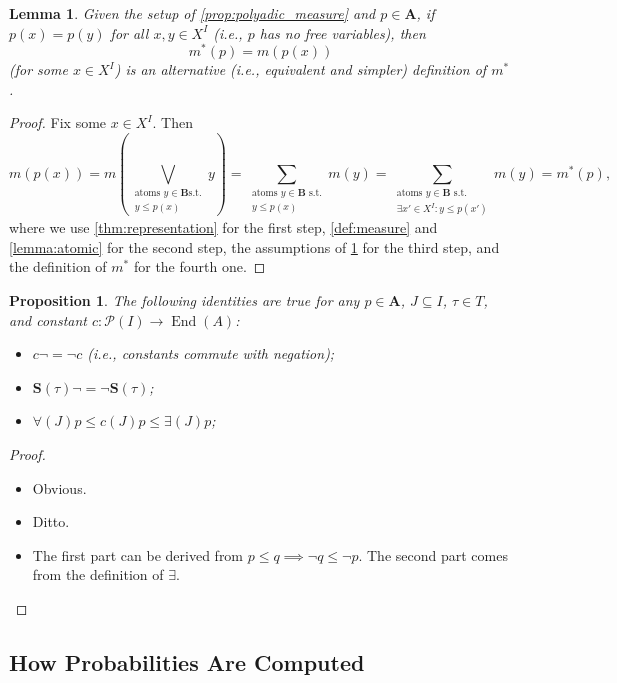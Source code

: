 \documentclass{article}
\newtheorem{lemma}{Lemma}
\newtheorem{proposition}{Proposition}
\theoremstyle{definition}
\theoremstyle{remark}
\DeclareMathOperator{\End}{End}
\begin{document}
\begin{lemma} \label{lemma:simple_measure}
  Given the setup of \cref{prop:polyadic_measure} and $p \in \mathbf{A}$, if
  $p(x) = p(y)$ for all $x, y \in X^I$ (i.e., $p$ has no free variables), then
  \[
    m^*(p) = m(p(x))
  \]
  (for some $x \in X^I$) is an alternative (i.e., equivalent and simpler)
  definition of $m^*$.
\end{lemma}
\begin{proof}
  Fix some $x \in X^I$. Then
  \[
    m(p(x)) = m \left( \bigvee_{\substack{\text{atoms } y \in \mathbf{B} \text{
            s.t.}\\
          y \le p(x)}} y \right) = \sum_{\substack{\text{atoms } y \in \mathbf{B}
        \text{ s.t.}\\
        y \le p(x)}} m(y) =\sum_{\substack{\text{atoms } y \in \mathbf{B}
        \text{ s.t.}\\
        \exists x' \in X^I : y \le p(x')}} m(y) = m^*(p),
  \]
  where we use \cref{thm:representation} for the first step,
  \cref{def:measure} and \cref{lemma:atomic} for the second step, the
  assumptions of \cref{lemma:simple_measure} for the third step, and the
  definition of $m^*$ for the fourth one.
\end{proof}

\begin{proposition}
  The following identities are true for any $p \in \mathbf{A}$, $J \subseteq I$,
  $\tau \in T$, and constant $c : \mathcal{P}(I) \to \End(A)$:
  \begin{itemize}
  \item $c \neg = \neg c$ (i.e., constants commute with negation);
  \item $\mathbf{S}(\tau) \neg = \neg \mathbf{S}(\tau)$;
  \item $\bm\forall(J)p \le c(J)p \le \bm\exists(J)p$;
  \end{itemize}
\end{proposition}
\begin{proof}
  \begin{itemize}
  \item Obvious.
  \item Ditto.
  \item The first part can be derived from $p \le q \implies \neg q \le \neg p$.
    The second part comes from the definition of $\bm\exists$.
  \end{itemize}
\end{proof}

\subsection{How Probabilities Are Computed}
\end{document}
